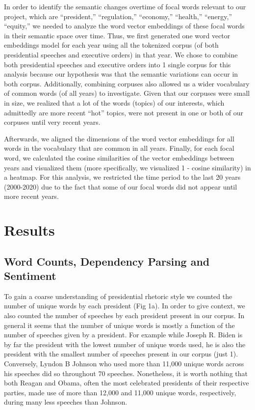 \documentclass{article}
\begin{document}
{{In order to identify the semantic changes overtime of focal words relevant to our project, which are “president,” “regulation,” “economy,” “health,” “energy,” “equity,” we needed to analyze the word vector embeddings of these focal words in their semantic space over time. Thus, we first generated one word vector embeddings model for each year using all the tokenized corpus (of both presidential speeches and executive orders) in that year. We chose to combine both presidential speeches and executive orders into 1 single corpus for this analysis because our hypothesis was that the semantic variations can occur in both corpus. Additionally, combining corpuses also allowed us a wider vocabulary of common words (of all years) to investigate. Given that our corpuses were small in size, we realized that a lot of the words (topics) of our interests, which admittedly are more recent “hot” topics, were not present in one or both of our corpuses until very recent years.
	
Afterwards, we aligned the dimensions of the word vector embeddings for all words in the vocabulary that are common in all years. Finally, for each focal word, we calculated the cosine similarities of the vector embeddings between years and visualized them (more specifically, we visualized 1 - cosine similarity) in a heatmap. For this analysis, we restricted the time period to the last 20 years (2000-2020) due to the fact that some of our focal words did not appear until more recent years. 
}
\newpage
\pagebreak
\section{Results}{	
\subsection{Word Counts, Dependency Parsing and Sentiment}{To gain a coarse understanding of presidential rhetoric style we counted the number of unique words by each president (Fig 1a). In order to give context, we also counted the number of speeches by each president present in our corpus. In general it seems that the number of unique words is mostly a function of the number of speeches given by a president. For example while Joseph R. Biden is by far the president with the lowest number of unique words used, he is also the president with the smallest number of speeches present in our corpus (just 1). Conversely, Lyndon B Johnson who used more than 11,000 unique words across his speeches did so throughout 70 speeches. Nonetheless, it is worth nothing that both Reagan and Obama, often the most celebrated presidents of their respective parties, made use of more than 12,000 and 11,000 unique words, respectively, during many less speeches than Johnson. 
	
}}}
\end{document}
